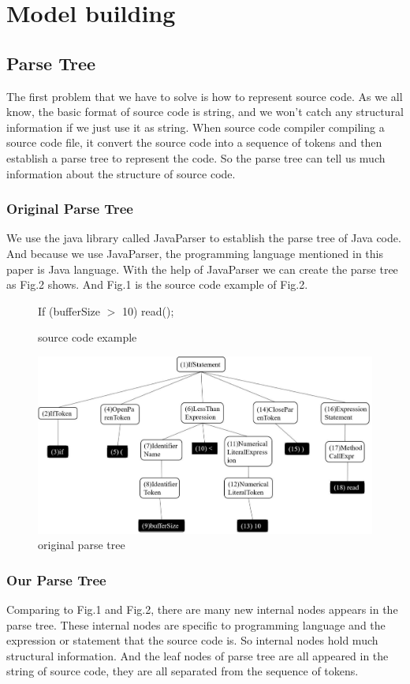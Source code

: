 \section{Model building}

\subsection{Parse Tree}
The first problem that we have to solve is how to represent source code. As we all know, the basic format of source code is string, and we won't catch any structural information if we just use it as string. When source code compiler compiling a source code file, it convert the source code into a sequence of tokens and then establish a parse tree to represent the code. So the parse tree can tell us much information about the structure of source code.
\subsubsection{Original Parse Tree}
We use the java library called JavaParser to establish the parse tree of Java code. And because we use JavaParser, the programming language mentioned in this paper is Java language. With the help of JavaParser we can create the parse tree as Fig.2 shows. And Fig.1 is the source code example of Fig.2.
\begin{figure}[!htp]
 \centering
 If (bufferSize $>$ 10) read();
 \caption{source code example}
\end{figure}

\begin{figure}[!htp]
 \centering
 \includegraphics[width=15cm]{img/parseTree1.pdf}
 \caption{original parse tree}
\end{figure}

\subsubsection{Our Parse Tree}\label{sec:ourParseTree}
Comparing to Fig.1 and Fig.2, there are many new internal nodes appears in the parse tree. These internal nodes are specific to programming language and the expression or statement that the source code is. So internal nodes hold much structural information. And the leaf nodes of parse tree are all appeared in the string of source code, they are all separated from the sequence of tokens.

